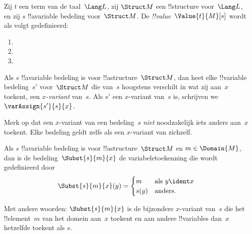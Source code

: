 \documentclass[../../../include/open-logic-section]{subfiles}
\begin{document}
\begin{defn}
Zij $t$ een term van de taal~$\Lang L$, zij $\Struct M$ een
!!{structure} voor~$\Lang L$, en zij $s$ !!a{variable} bedeling
voor~$\Struct M$. De \emph{!!{value}}~$\Value{t}{M}[s]$ wordt als
volgt gedefinieerd:
\begin{enumerate}
\item {}
\item {}
\item {}
\end{enumerate}
\end{defn}

\begin{defn}[$x$-variant]
Als $s$ !!a{variable} bedeling is voor !!a{structure}~$\Struct M$, dan heet
elke !!{variable} bedeling~$s'$ voor~$\Struct M$ die van~$s$ hoogstens
verschilt in wat zij aan~$x$ toekent, een \emph{$x$-variant} van~$s$. Als
$s'$ een $x$-variant van~$s$ is, schrijven we $\varAssign{s'}{s}{x}$.
\end{defn}

\begin{explain}
Merk op dat een $x$-variant van een bedeling~$s$ \emph{niet} noodzakelijk iets
anders aan~$x$ toekent. Elke bedeling geldt zelfs als een $x$-variant
van zichzelf.
\end{explain}

\begin{defn}
  Als $s$ !!a{variable} bedeling is voor !!a{structure}~$\Struct M$
  en $m \in \Domain{M}$, dan is de bedeling~$\Subst{s}{m}{x}$ de
  variabeletoekenning die wordt gedefinieerd door
  \[\Subst{s}{m}{x}(y) = \begin{cases}
    m & \text{als } y \ident x\\
    s(y) & \text{anders}.
  \end{cases}\]
\end{defn}

Met andere woorden: $\Subst{s}{m}{x}$ is de bijzondere $x$-variant van~$s$
die het !!{element}~$m$ van het domein aan~$x$ toekent en aan andere
!!{variable}s dan~$x$ hetzelfde toekent als $s$.
\end{document}
